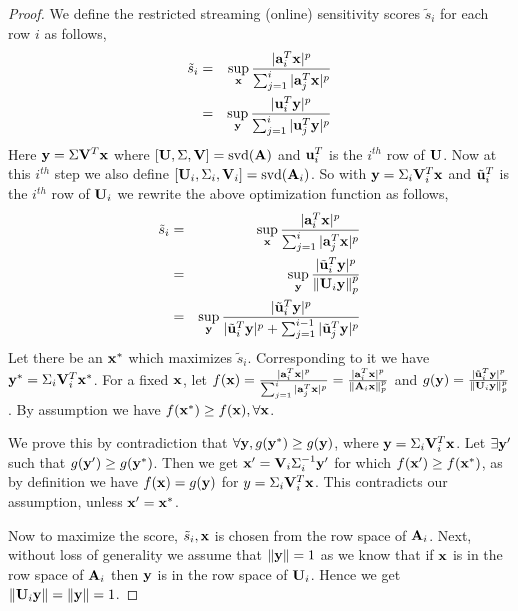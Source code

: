\begin{proof}{\label{proof:onlineSensitivityBound}}
We define the restricted streaming (online) sensitivity scores $\tilde{s}_{i}$ for each row $i$ as follows,
\begin{eqnarray*}
 \tilde{s}_{i} &=& \sup_{\mathbf{x}}\frac{\vert \mathbf{a}_{i}^{T}\mathbf{x}\vert^{p}}{\sum_{j=1}^{i}\vert \mathbf{a}_{j}^{T}\mathbf{x}\vert^{p}} \\
 &=& \sup_{\mathbf{y}}\frac{\vert \mathbf{u}_{i}^{T}\mathbf{y}\vert^{p}} {\sum_{j=1}^{i}\vert \mathbf{u}_{j}^{T}\mathbf{y}\vert^{p}}
\end{eqnarray*}
Here $\mathbf{y} = \Sigma \mathbf{V}^{T}\mathbf{x}$ where $[\mathbf{U},\Sigma,\mathbf{V}] = \mbox{svd}(\mathbf{A})$ and $\mathbf{u}_{i}^{T}$ is the $i^{th}$ row of $\mathbf{U}$. Now at this $i^{th}$ step we also define $[\mathbf{U}_{i},\Sigma_{i},\mathbf{V}_{i}] = \mbox{svd}(\mathbf{A}_{i})$. So with $\mathbf{y} = \Sigma_{i} \mathbf{V}_{i}^{T}\mathbf{x}$ and $\tilde{\mathbf{u}}_{i}^{T}$ is the $i^{th}$ row of $\mathbf{U}_{i}$ we rewrite the above optimization function as follows,
\begin{eqnarray*}
 \tilde{s}_{i} &=& \sup_{\mathbf{x}}\frac{\vert \mathbf{a}_{i}^{T}\mathbf{x}\vert^{p}}{\sum_{j=1}^{i}\vert \mathbf{a}_{j}^{T}\mathbf{x}\vert^{p}} \\
 &=& \sup_{\mathbf{y}}\frac{\vert \tilde{\mathbf{u}}_{i}^{T}\mathbf{y}\vert^{p}}{\left\lVert\mathbf{U}_{i}\mathbf{y}\right\rVert_{p}^{p}} \\ 
 &=& \sup_{\mathbf{y}}\frac{\vert \tilde{\mathbf{u}}_{i}^{T}\mathbf{y}\vert^{p}}{\vert \tilde{\mathbf{u}}_{i}^{T}\mathbf{y}\vert^{p}+\sum_{j=1}^{i-1}\vert \tilde{\mathbf{u}}_{j}^{T}\mathbf{y}\vert^{p}}
\end{eqnarray*}
Let there be an $\mathbf{x}^{*}$ which maximizes $\tilde{s}_{i}$. Corresponding to it we have  $\mathbf{y}^{*} = \Sigma_{i} \mathbf{V}_{i}^{T}\mathbf{x}^{*}$. For a fixed $\mathbf{x}$, let $f(\mathbf{x}) = \frac{\vert \mathbf{a}_{i}^{T}\mathbf{x}\vert^{p}}{\sum_{j=1}^{i}\vert \mathbf{a}_{j}^{T}\mathbf{x}\vert^{p}} = \frac{|\mathbf{a}_{i}^{T}\mathbf{x}|^{p}}{\|\mathbf{A}_{i}\mathbf{x}\|_{p}^{p}}$ and $g(\mathbf{y}) = \frac{\vert \tilde{\mathbf{u}}_{i}^{T}\mathbf{y}\vert^{p}}{\left\lVert\mathbf{U}_{i}\mathbf{y}\right\rVert_{p}^{p}}$. By assumption we have $f(\mathbf{x}^{*}) \geq f(\mathbf{x}), \forall \mathbf{x}$. 

We prove this by contradiction that $\forall \mathbf{y}, g(\mathbf{y}^{*}) \geq g(\mathbf{y})$, where $\mathbf{y} = \Sigma_{i} \mathbf{V}_{i}^{T}\mathbf{x}$. Let $\exists \mathbf{y}'$ such that $g(\mathbf{y}') \geq g(\mathbf{y}^{*})$. Then we get $\mathbf{x}' = \mathbf{V}_{i}\Sigma_{i}^{-1}\mathbf{y}'$ for which $f(\mathbf{x}')\geq f(\mathbf{x}^{*})$, as by definition we have $f(\mathbf{x}) = g(\mathbf{y})$ for $y = \Sigma_{i}\mathbf{V}_{i}^{T}\mathbf{x}$. This contradicts our assumption, unless $\mathbf{x}' = \mathbf{x}^{*}$. 

Now to maximize the score, $\tilde{s}_{i}, \mathbf{x}$ is chosen from the row space of $\mathbf{A}_{i}$. Next, without loss of generality we assume that $\left\lVert\mathbf{y}\right\rVert = 1$ as we know that if $\mathbf{x}$ is in the row space of $\mathbf{A}_{i}$ then $\mathbf{y}$ is in the row space of $\mathbf{U}_{i}$. Hence we get $\left\lVert\mathbf{U}_{i}\mathbf{y}\right\rVert = \left\lVert\mathbf{y}\right\rVert = 1$.


\end{proof}

